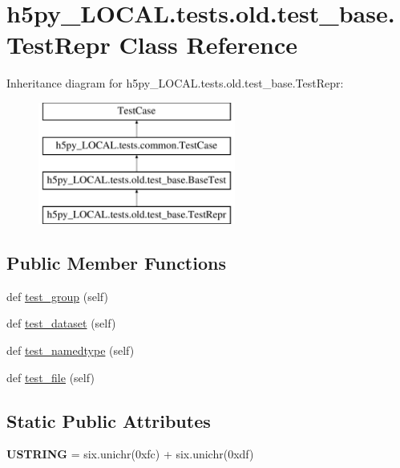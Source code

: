 \hypertarget{classh5py__LOCAL_1_1tests_1_1old_1_1test__base_1_1TestRepr}{}\section{h5py\+\_\+\+L\+O\+C\+A\+L.\+tests.\+old.\+test\+\_\+base.\+Test\+Repr Class Reference}
\label{classh5py__LOCAL_1_1tests_1_1old_1_1test__base_1_1TestRepr}
Inheritance diagram for h5py\+\_\+\+L\+O\+C\+A\+L.\+tests.\+old.\+test\+\_\+base.\+Test\+Repr\+:\begin{figure}[H]
\begin{center}
\leavevmode
\includegraphics[height=4.000000cm]{classh5py__LOCAL_1_1tests_1_1old_1_1test__base_1_1TestRepr}
\end{center}
\end{figure}
\subsection*{Public Member Functions}
\begin{DoxyCompactItemize}
\item 
def \hyperlink{classh5py__LOCAL_1_1tests_1_1old_1_1test__base_1_1TestRepr_a94d7aa882abde4bf79af3bae34231f37}{test\+\_\+group} (self)
\item 
def \hyperlink{classh5py__LOCAL_1_1tests_1_1old_1_1test__base_1_1TestRepr_af4350204bfef1db75a44bd8b8dcf42a3}{test\+\_\+dataset} (self)
\item 
def \hyperlink{classh5py__LOCAL_1_1tests_1_1old_1_1test__base_1_1TestRepr_a31686a4fcfceb891710c9175aad45260}{test\+\_\+namedtype} (self)
\item 
def \hyperlink{classh5py__LOCAL_1_1tests_1_1old_1_1test__base_1_1TestRepr_ab3882365cbed2aab5bb105a346e2f38a}{test\+\_\+file} (self)
\end{DoxyCompactItemize}
\subsection*{Static Public Attributes}
\begin{DoxyCompactItemize}
\item 
\mbox{\label{classh5py__LOCAL_1_1tests_1_1old_1_1test__base_1_1TestRepr_a18f22beb6e5f33688a6eb535ab733ca0}} 
{\bfseries U\+S\+T\+R\+I\+NG} = six.\+unichr(0xfc) + six.\+unichr(0xdf)
\end{DoxyCompactItemize}
